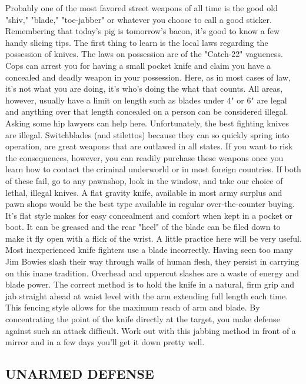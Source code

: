 \documentclass[11pt,twoside,a4paper]{book}
\begin{document}
	Probably one of the most favored street weapons of all time is the good old "shiv," "blade," "toe-jabber" or whatever you choose to call a good sticker. Remembering that today's pig is tomorrow's bacon, it's good to know a few handy slicing tips. The first thing to learn is the local laws regarding the possession of knives. The laws on possession are of the "Catch-22" vagueness. Cops can arrest you for having a small pocket knife and claim you have a concealed and deadly weapon in your possession. Here, as in most cases of law, it's not what you are doing, it's who's doing the what that counts. All areas, however, usually have a limit on length such as blades under 4" or 6" are legal and anything over that length concealed on a person can be considered illegal. Asking some hip lawyers can help here. Unfortunately, the best fighting knives are illegal. Switchblades (and stilettos) because they can so quickly spring into operation, are great weapons that are outlawed in all states. If you want to risk the consequences, however, you can readily purchase these weapons once you learn how to contact the criminal underworld or in most foreign countries. If both of these fail, go to any pawnshop, look in the window, and take our choice of lethal, illegal knives. A flat gravity knife, available in most army surplus and pawn shops would be the best type available in regular over-the-counter buying. It's flat style makes for easy concealment and comfort when kept in a pocket or boot. It can be greased and the rear "heel" of the blade can be filed down to make it fly open with a flick of the wrist. A little practice here will be very useful. Most inexperienced knife fighters use a blade incorrectly. Having seen too many Jim Bowies slash their way through walls of human flesh, they persist in carrying on this inane tradition. Overhead and uppercut slashes are a waste of energy and blade power. The correct method is to hold the knife in a natural, firm grip and jab straight ahead at waist level with the arm extending full length each time. This fencing style allows for the maximum reach of arm and blade. By concentrating the point of the knife directly at the target, you make defense against such an attack difficult. Work out with this jabbing method in front of a mirror and in a few days you'll get it down pretty well. 

\subsection{UNARMED DEFENSE}
\end{document}
